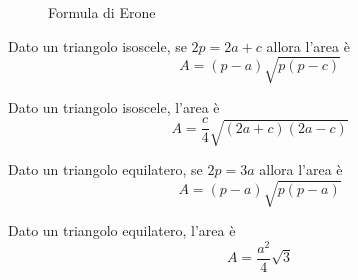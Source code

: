\begin{figure}
	\centering
	
	\caption{Formula di Erone}
	\label{fig:erone1}
\end{figure}
\begin{cor}\label{cor:Formula_Erone_isoscele}
	Dato un triangolo isoscele, se $2p=2a+c$ allora l'area è \[A=(p-a)\sqrt{p(p-c)}\]
\end{cor}
\begin{cor}\label{cor:Formula_Erone_isoscele_2}
	Dato un triangolo isoscele, l'area è \[A=\dfrac{c}{4}\sqrt{(2a+c)(2a-c)}\]
\end{cor}
\begin{cor}\label{cor:Formula_Erone_equilatero}
	Dato un triangolo equilatero, se $2p=3a$ allora l'area è \[A=(p-a)\sqrt{p(p-a)}\]
\end{cor}
\begin{cor}\label{cor:Formula_Erone_equilatero_2}
	Dato un triangolo equilatero, l'area è \[A=\dfrac{a^2}{4}\sqrt{3}\]
\end{cor}